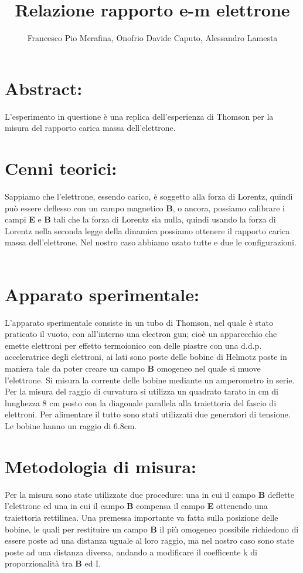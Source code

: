 \documentclass{article}
\title{Relazione rapporto e-m elettrone}
\author{Francesco Pio Merafina, Onofrio Davide Caputo, Alessandro Lamesta}
\date{}
\begin{document}
\maketitle
\section{Abstract:}
L'esperimento in questione è una replica dell'esperienza di Thomson per la misura del rapporto carica massa dell'elettrone.
~
\section{Cenni teorici:}
Sappiamo che l'elettrone, essendo carico, è soggetto alla forza di Lorentz, quindi può essere deflesso con un campo magnetico \textbf{B}, o ancora, possiamo calibrare i campi \textbf{E} e \textbf{B} tali che la forza di Lorentz sia nulla, quindi usando la forza di Lorentz nella seconda legge della dinamica possiamo ottenere il rapporto carica massa dell'elettrone. Nel nostro caso abbiamo usato tutte e due le configurazioni.
~
\section{Apparato sperimentale:}
L'apparato sperimentale consiste in un tubo di Thomson, nel quale è stato praticato il vuoto, con all'interno una electron gun; cioè un apparecchio che emette elettroni per effetto termoionico con delle piastre con una d.d.p. acceleratrice degli elettroni, ai lati sono poste delle bobine di Helmotz poste in maniera tale da poter creare un campo \textbf{B} omogeneo nel quale si muove l'elettrone. Si misura la corrente delle bobine mediante un amperometro in serie. Per la misura del raggio di curvatura si utilizza un quadrato tarato in cm di lunghezza 8 cm posto con la diagonale parallela alla traiettoria del fascio di elettroni. Per alimentare il tutto sono stati utilizzati due generatori di tensione. Le bobine hanno un raggio di 6.8cm.
~
\section{Metodologia di misura:}
Per la misura sono state utilizzate due procedure: una in cui il campo \textbf{B} deflette l'elettrone ed una in cui il campo \textbf{B} compensa il campo \textbf{E} ottenendo una traiettoria rettilinea. Una premessa importante va fatta sulla posizione delle bobine, le quali per restituire un campo \textbf{B} il più omogeneo possibile richiedono di essere poste ad una distanza uguale al loro raggio, ma nel nostro caso sono state poste ad una distanza diversa, andando a modificare il coefficente k di proporzionalità tra \textbf{B} ed I.
\end{document}
